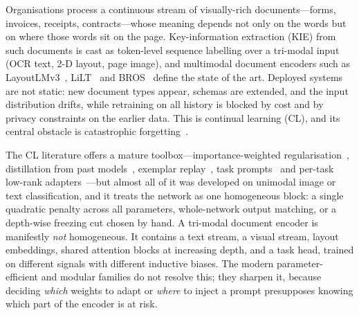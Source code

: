 \documentclass{article}
\begin{document}
Organisations process a continuous stream of visually-rich documents---forms, invoices, receipts, contracts---whose meaning depends not only on the words but on where those words sit on the page. Key-information extraction (KIE) from such documents is cast as token-level sequence labelling over a tri-modal input (OCR text, 2-D layout, page image), and multimodal document encoders such as LayoutLMv3~\citep{huang2022layoutlmv3}, LiLT~\citep{wang2022lilt} and BROS~\citep{hong2022bros} define the state of the art. Deployed systems are not static: new document types appear, schemas are extended, and the input distribution drifts, while retraining on all history is blocked by cost and by privacy constraints on the earlier data. This is continual learning (CL), and its central obstacle is catastrophic forgetting~\citep{mccloskey1989catastrophic}.

The CL literature offers a mature toolbox---importance-weighted regularisation~\citep{kirkpatrick2017ewc}, distillation from past models~\citep{li2017lwf}, exemplar replay~\citep{rolnick2019er,buzzega2020der}, task prompts~\citep{wang2022l2p,wang2022dualprompt,smith2023coda} and per-task low-rank adapters~\citep{wang2023olora}---but almost all of it was developed on unimodal image or text classification, and it treats the network as one homogeneous block: a single quadratic penalty across all parameters, whole-network output matching, or a depth-wise freezing cut chosen by hand. A tri-modal document encoder is manifestly \emph{not} homogeneous. It contains a text stream, a visual stream, layout embeddings, shared attention blocks at increasing depth, and a task head, trained on different signals with different inductive biases. The modern parameter-efficient and modular families do not resolve this; they sharpen it, because deciding \emph{which} weights to adapt or \emph{where} to inject a prompt presupposes knowing which part of the encoder is at risk.
\end{document}
